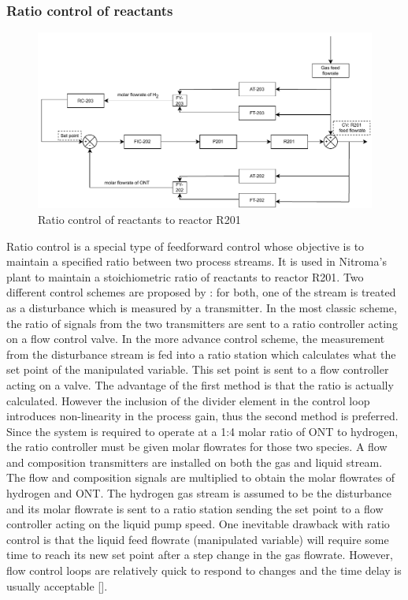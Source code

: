 \subsubsection{Ratio control of reactants} %
    \begin{figure}[h]
    \centering
    \includegraphics[width=\linewidth]{chapters/4-operation-control/4-Figures/R201-FC.pdf}
    \caption{Ratio control of reactants to reactor R201}
    \label{fig:R201-FC}
    \end{figure} 
Ratio control is a special type of feedforward control whose objective is to maintain a specified ratio between two process streams. It is used in Nitroma's plant to maintain a stoichiometric ratio of reactants to reactor R201. Two different control schemes are proposed by \textcite{}: for both, one of the stream is treated as a disturbance which is measured by a transmitter. In the most classic scheme, the ratio of signals from the two transmitters are sent to a ratio controller acting on a flow control valve. In the more advance control scheme, the measurement from the disturbance stream is fed into a ratio station which calculates what the set point of the manipulated variable. This set point is sent to a flow controller acting on a valve. The advantage of the first method is that the ratio is actually calculated. However the inclusion of the divider element in the control loop introduces non-linearity in the process gain, thus the second method is preferred. Since the system is required to operate at a 1:4 molar ratio of ONT to hydrogen, the ratio controller must be given molar flowrates for those two species. A flow and composition transmitters are installed on both the gas and liquid stream. The flow and composition signals are multiplied to obtain the molar flowrates of hydrogen and ONT. The hydrogen gas stream is assumed to be the disturbance and its molar flowrate is sent to a ratio station sending the set point to a flow controller acting on the liquid pump speed. One inevitable drawback with ratio control is that the liquid feed flowrate (manipulated variable) will require some time to reach its new set point after a step change in the gas flowrate. However, flow control loops are relatively quick to respond to changes and the time delay is usually acceptable [].




